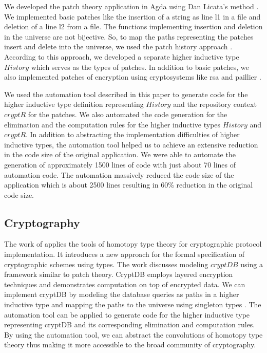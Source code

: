 \documentclass[sigplan,10pt]{acmart}
\begin{document}
We developed the patch theory application in Agda using Dan Licata's method \cite{Licata-2011}. We implemented basic patches like the insertion of a string as line l1 in a file and deletion of a line l2 from a file. The functions implementing insertion and deletion in the universe are not bijective. So, to map the paths representing the patches insert and delete into the universe, we used the patch history approach \cite{Angiuli-2014}. According to this approach, we developed a separate higher inductive type $History$ which serves as the types of patches. In addition to basic patches, we also implemented patches of encryption using cryptosystems like rsa \cite{Rivest-1978} and paillier \cite{Paillier-1999}.

We used the automation tool described in this paper to generate code for the higher inductive type definition representing $History$ and the repository context $cryptR$ for the patches. We also automated the code generation for the elimination and the computation rules for the higher inductive types $History$ and $cryptR$. In addition to abstracting the implementation difficulties of higher inductive types, the automation tool helped us to achieve an extensive reduction in the code size of the original application. We were able to automate the generation of approximately 1500 lines of code with just about 70 lines of automation code. The automation massively reduced the code size of the application which is about 2500 lines resulting in 60\% reduction in the original code size.

\subsection{Cryptography}
\label{crypto}
The work of \cite{Paventhan-2018} applies the tools of homotopy type theory for cryptographic protocol implementation. It introduces a new approach for the formal specification of cryptographic schemes using types. The work discusses modeling $cryptDB$ \citep{Popa-2011} using a framework similar to patch theory. CryptDB employs layered encryption techniques and demonstrates computation on top of encrypted data. We can implement cryptDB by modeling the database queries as paths in a higher inductive type and mapping the paths to the universe using singleton types \cite{Angiuli-2014}. The automation tool can be applied to generate code for the higher inductive type representing cryptDB and its corresponding elimination and computation rules. By using the automation tool, we can abstract the convolutions of homotopy type theory thus making it more accessible to the broad community of cryptography.
\end{document}
